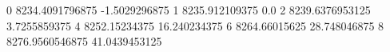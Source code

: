 0 8234.4091796875 -1.5029296875
1 8235.912109375 0.0
2 8239.6376953125 3.7255859375
4 8252.15234375 16.240234375
6 8264.66015625 28.748046875
8 8276.9560546875 41.0439453125

